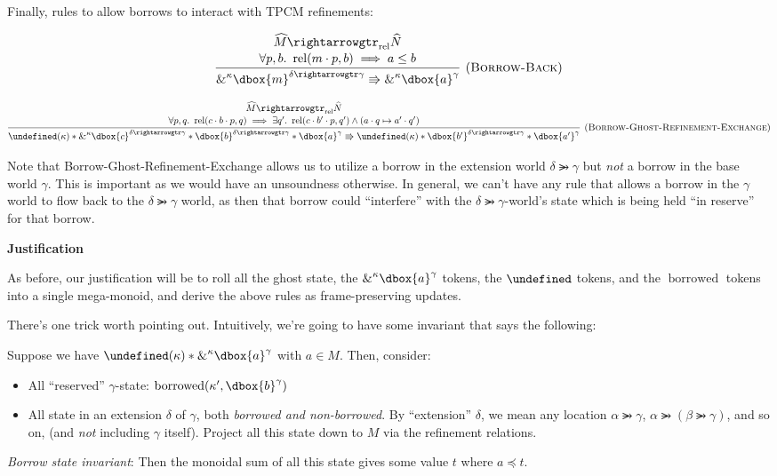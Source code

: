 \documentclass{article}
\newcommand{\einfer}[3]
        {\infer[(\textsc{#1})]{#3}{#2}}
\newcommand{\stacktwo}[2]{\stackanchor{\ensuremath{#1}}{\ensuremath{#2}}}
\newcommand\dboxed[1]{\dbox{\vphantom{t}\ensuremath{#1}}}
\newcommand{\viewshift}{\Rrightarrow}
\DeclareMathOperator{\rel}{rel}
\newcommand{\borrow}[2]{\textsc{\&}^{#1}#2}
\newcommand{\refines}{\rightarrowgtr}
\DeclareMathOperator{\borrowed}{borrowed}
\let\active\undefined
\DeclareMathOperator{\active}{active}
\begin{document}
Finally, rules to allow borrows to interact with TPCM refinements:

\[
  \einfer{Borrow-Back}{
    \stacktwo{
      \widehat{M} \refines_{\rel} \widehat{N}
    }{
      \forall p, b .~ \rel(m \cdot p, b) \implies a \le b
    }
  }{
    \borrow{\kappa}{\dboxed{m}^{\delta \refines \gamma}} \viewshift \borrow{\kappa}{\dboxed{a}^\gamma}
  }
\]

\[
  \einfer{Borrow-Ghost-Refinement-Exchange}{
    \stacktwo{
      \widehat{M} \refines_{\rel} \widehat{N}
    }{
      \forall p,q.~ \rel(c\cdot b\cdot p, q) \implies \exists q' .~ \rel(c \cdot b' \cdot p, q') \land (a \cdot q \mapsto a' \cdot q')
    }
  }{
    \active(\kappa) *
    \borrow{\kappa}{\dboxed{c}^{\delta\refines\gamma}} *
    \dboxed{b}^{\delta\refines\gamma} * \dboxed{a}^\gamma
      \viewshift
    \active(\kappa) *
    \dboxed{b'}^{\delta\refines\gamma} * \dboxed{a'}^\gamma
  }
\]


Note that Borrow-Ghost-Refinement-Exchange allows us to utilize a borrow in the extension world $\delta \refines \gamma$ but \emph{not} a borrow in the base world $\gamma$. This is important as we would have an unsoundness otherwise. In general, we can't have any rule that allows a borrow in the $\gamma$ world to flow back to the $\delta \refines \gamma$ world, as then that borrow could ``interfere'' with the $\delta\refines\gamma$-world's state which is being held ``in reserve'' for that borrow.

\textbf{Justification}

As before, our justification will be to roll all the ghost state, the $\borrow{\kappa}{\dboxed{a}^\gamma}$ tokens, the $\active$ tokens, and the $\borrowed$
tokens into a single mega-monoid, and derive the above rules as frame-preserving updates.

There's one trick worth pointing out. Intuitively, we're going to have some invariant
that says the following:

Suppose we have $\active(\kappa) * \borrow{\kappa}{\dboxed{a}^\gamma}$ with $a \in M$. Then, consider:
\begin{itemize}
  \item All ``reserved'' $\gamma$-state: $\borrowed(\kappa', \dboxed{b}^\gamma)$
  \item All state in an extension $\delta$ of $\gamma$, both \emph{borrowed and non-borrowed}.
        By ``extension'' $\delta$, we mean any location $\alpha \refines \gamma$,
        $\alpha \refines (\beta \refines \gamma)$, and so on, (and \emph{not} including $\gamma$ itself).
        Project all this state down to $M$ via the refinement relations.
\end{itemize}
\emph{Borrow state invariant}: Then the monoidal sum of all this state gives some value $t$ where $a \preceq t$.
\end{document}
